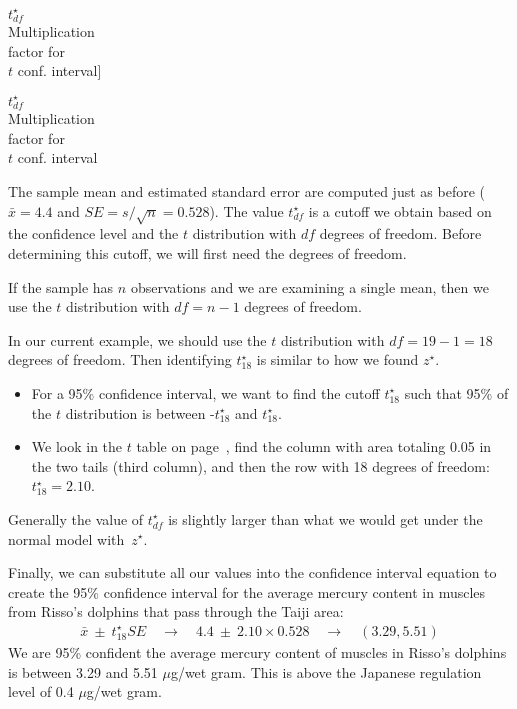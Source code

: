 $t^{\star}_{df}$\vspace{1mm}\\\footnotesize Multiplication\\factor for\\$t$ conf. interval]{\raggedright\vspace{-9mm}

$t^{\star}_{df}$\vspace{1mm}\\\footnotesize Multiplication\\factor for\\$t$ conf. interval}The sample mean and estimated standard error are computed just as before ($\bar{x} = 4.4$ and $SE = s/\sqrt{n} = 0.528$). The value $t^{\star}_{df}$ is a cutoff we obtain based on the confidence level and the $t$ distribution with $df$ degrees of freedom. Before determining this cutoff, we will first need the degrees of freedom.

\begin{termBox}{
If the sample has $n$ observations and we are examining a single mean, then we use the $t$ distribution with $df=n-1$ degrees of freedom.}
\end{termBox}

In our current example, we should use the $t$ distribution with $df=19-1=18$ degrees of freedom. Then identifying $t_{18}^{\star}$ is similar to how we found $z^{\star}$. 
\begin{itemize}
\setlength{\itemsep}{0mm}
\item For a 95\% confidence interval, we want to find the cutoff $t^{\star}_{18}$ such that 95\% of the $t$ distribution is between -$t^{\star}_{18}$ and $t^{\star}_{18}$.
\item We look in the $t$ table on page~\pageref{tTableSample}, find the column with area totaling 0.05 in the two tails (third column), and then the row with 18 degrees of freedom: $t^{\star}_{18} = 2.10$.
\end{itemize}
Generally the value of $t^{\star}_{df}$ is slightly larger than what we would get under the normal model with~$z^{\star}$.



Finally, we can substitute all our values into the confidence interval equation to create the 95\% confidence interval for the average mercury content in muscles from Risso's dolphins that pass through the Taiji area:
\begin{eqnarray*}
\bar{x} \ \pm\  t^{\star}_{18}SE
	\quad \to \quad
4.4 \ \pm\  2.10 \times 0.528
	\quad \to \quad
(3.29, 5.51)
\end{eqnarray*}
We are 95\% confident the average mercury content of muscles in Risso's dolphins is between 3.29 and 5.51 $\mu$g/wet gram. This is above the Japanese regulation level of 0.4 $\mu$g/wet gram.


